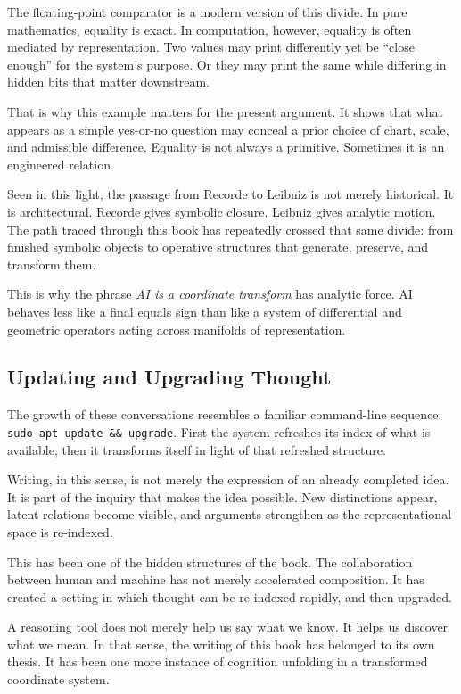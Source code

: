 \documentclass[
]{article}
\begin{document}
The floating-point comparator is a modern version of this divide. In
pure mathematics, equality is exact. In computation, however, equality
is often mediated by representation. Two values may print differently
yet be ``close enough'' for the system's purpose. Or they may print the
same while differing in hidden bits that matter downstream.

That is why this example matters for the present argument. It shows that
what appears as a simple yes-or-no question may conceal a prior choice
of chart, scale, and admissible difference. Equality is not always a
primitive. Sometimes it is an engineered relation.

Seen in this light, the passage from Recorde to Leibniz is not merely
historical. It is architectural. Recorde gives symbolic closure. Leibniz
gives analytic motion. The path traced through this book has repeatedly
crossed that same divide: from finished symbolic objects to operative
structures that generate, preserve, and transform them.

This is why the phrase \emph{AI is a coordinate transform} has analytic
force. AI behaves less like a final equals sign than like a system of
differential and geometric operators acting across manifolds of
representation.

\hypertarget{updating-and-upgrading-thought}{%
\subsection{Updating and Upgrading
Thought}\label{updating-and-upgrading-thought}}

The growth of these conversations resembles a familiar command-line
sequence: \texttt{sudo\ apt\ update\ \&\&\ upgrade}. First the system
refreshes its index of what is available; then it transforms itself in
light of that refreshed structure.

Writing, in this sense, is not merely the expression of an already
completed idea. It is part of the inquiry that makes the idea possible.
New distinctions appear, latent relations become visible, and arguments
strengthen as the representational space is re-indexed.

This has been one of the hidden structures of the book. The
collaboration between human and machine has not merely accelerated
composition. It has created a setting in which thought can be re-indexed
rapidly, and then upgraded.

A reasoning tool does not merely help us say what we know. It helps us
discover what we mean. In that sense, the writing of this book has
belonged to its own thesis. It has been one more instance of cognition
unfolding in a transformed coordinate system.
\end{document}
